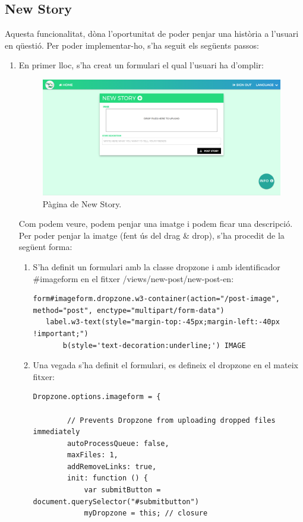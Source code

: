 \documentclass[11pt,catalan,listoffigures,listoftables]{tfgetsinf}
\begin{document}
\subsection{New Story}
Aquesta funcionalitat, dòna l'oportunitat de poder penjar una història a l'usuari en qüestió. Per poder implementar-ho, s'ha seguit els següents passos:
\newpage
\begin{enumerate}
\item En primer lloc, s'ha creat un formulari el qual l'usuari ha d'omplir:
\begin{figure}[h]
\includegraphics[width=15cm]{images/image14}
\centering
\caption[Figura 4.9]{Pàgina de New Story.}
\centering
\end{figure}
Com podem veure, podem penjar una imatge i podem ficar una descripció. Per poder penjar la imatge (fent ús del drag \& drop), s'ha procedit de la següent forma:
\begin{enumerate}
\item S'ha definit un formulari amb la classe dropzone i amb identificador \#imageform en el fitxer /views/new-post/new-post-en:
\begin{lstlisting}
form#imageform.dropzone.w3-container(action="/post-image", method="post", enctype="multipart/form-data")
   label.w3-text(style="margin-top:-45px;margin-left:-40px !important;")
       b(style='text-decoration:underline;') IMAGE
\end{lstlisting}
\item Una vegada s'ha definit el formulari, es defineix el dropzone en el mateix fitxer:
\begin{lstlisting}
Dropzone.options.imageform = {

        // Prevents Dropzone from uploading dropped files immediately
        autoProcessQueue: false,
        maxFiles: 1,
        addRemoveLinks: true,
        init: function () {
            var submitButton = document.querySelector("#submitbutton")
            myDropzone = this; // closure


\end{lstlisting}
\end{enumerate}
\end{enumerate}
\end{document}
